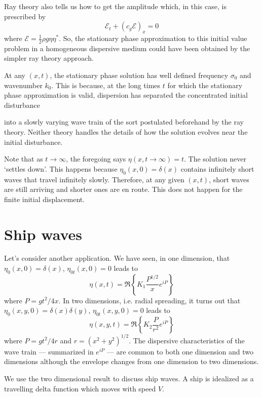 Ray theory also tells us how to get the amplitude which, in this case, is
prescribed by
\[
	\mathcal E_t+(c_g\mathcal E)_x=0
\]
where $\mathcal E=\frac12\rho g\eta\eta^*$. So, the stationary phase approximation to this initial value problem
in a homogeneous dispersive medium could have been obtained by the simpler ray
theory approach.

At any $(x,t)$, the stationary phase solution has well defined frequency $\sigma_0$ and
wavenumber $k_0$. This is because, at the long times $t$ for which the stationary phase
approximation is valid, dispersion has separated the concentrated initial disturbance

\sourcepagebreak

into a slowly varying wave train of the sort postulated beforehand by the ray theory.
Neither theory handles the details of how the solution evolves near the initial
disturbance.

Note that as $t\to\infty$, the foregoing says $\eta(x,t\to\infty)=t$. The solution never
`settles down'. This happens because $\eta_0(x,0)=\delta(x)$ contains infinitely short waves
that travel infinitely slowly. Therefore, at any given $(x,t)$, short waves are still arriving
and shorter ones are en route. This does not happen for the finite initial displacement.

\section{Ship waves}

Let's consider another application. We have seen, in one dimension, that
$\eta_0(x,0)=\delta(x)$, $\eta_{0t}(x,0)=0$ leads to
\[
	\eta(x,t)=\Re\left\{K_1\frac{P^{1/2}}{x}e^{iP}\right\}
\]
where $P=gt^2/4x$. In two dimensions, i.e. radial spreading, it turns out that
$\eta_0(x,y,0)=\delta(x)\delta(y)$, $\eta_{0t}(x,y,0)=0$ leads to
\[
	\eta(x,y,t)=\Re\left\{K_2\frac{P}{r^2}e^{iP}\right\}
\]
where $P=gt^2/4r$ and $r=(x^2+y^2)^{1/2}$. The dispersive characteristics of the wave train
--- summarized in $e^{iP}$ --- are common to both one dimension and two dimensions
although the envelope changes from one dimension to two dimensions.

We use the two dimensional result to discuss ship waves. A ship is idealized as a
travelling delta function which moves with speed $V$.

